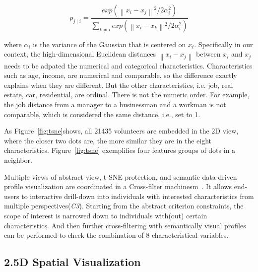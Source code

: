 \begin{equation}
p_{j\mid i} = \frac{exp({\left \| x_i - x_j \right \|}^2/2\alpha_i ^{2})}{\sum _{k\neq i}exp({\left \| x_i - x_k \right \|}^2/2\alpha_i ^{2})}
\end{equation}

where $\alpha_i$ is the variance of the Gaussian that is centered on $x_i$. Specifically in our context, the high-dimensional Euclidean distances $\left \| x_i - x_j \right \|$ between $x_i$ and $x_j$ needs to be adpated the numerical and categorical characteristics. Characteristics such as age, income, are numerical and comparable, so the difference exactly explains when they are different. But the other characteristics, i.e. job, real estate, car, residential, are ordinal. There is not the numeric order. For example, the job distance from a manager to a businessman and a workman is not comparable, which is considered the same distance, i.e., set to 1.


As Figure~\ref{fig:tsne}shows, all 21435 volunteers are embedded in the 2D view, where the closer two dots are, the more similar they are in the eight characteristics. Figure~\ref{fig:tsne} exemplifies four features groups of dots in a neighbor.

Multiple views of abstract view, t-SNE protection, and semantic data-driven profile visualization are coordinated in a Cross-filter machinesm~\citep{Weaver2010}. It allows end-users to interactive drill-down into individuals with interested characteristics from multiple perspectives(\textit{C3}). Starting from the abstract criterion constraints, the scope of interest is narrowed down to individuals with(out) certain characteristics. And then further cross-filtering with semantically visual profiles can be performed to check the combination of 8 characteristical variables.


\subsection{2.5D Spatial Visualization}

\label{subsec:25D}

